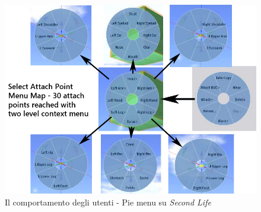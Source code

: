 				\begin{figure}
				\centering
					\includegraphics[width=\textwidth]{images/IlComportamentoDegliUtenti-PieMenu}
					\caption{Il comportamento degli utenti - Pie menu su \emph{Second Life}}
					\label{fig:PieMenu}
				\end{figure}